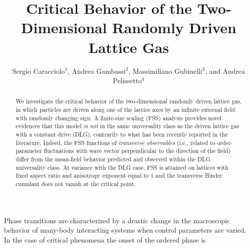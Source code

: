 \documentclass[aps,prl,twocolumn,floatfix,amssymb,showpacs]{revtex4}
\begin{document}
\title{Critical Behavior of the Two-Dimensional Randomly Driven Lattice Gas}
\author{Sergio Caracciolo$^{1}$, Andrea Gambassi$^{2}$, Massimiliano
Gubinelli$^{3}$, and Andrea Pelissetto$^{4}$}
\begin{abstract}
We investigate the critical behavior of the two-dimensional 
randomly driven lattice gas, in which particles 
are driven along one of the lattice axes by an infinite external field with
randomly changing sign. 
A finite-size scaling (FSS) analysis 
provides novel evidences that this model 
{\it is not} in the same universality class as the driven lattice gas with a
constant drive (DLG), contrarily to what has been recently reported in
the literature.
Indeed, the FSS functions of {\it transverse observables}
(i.e., related to order-parameter fluctuations with wave
vector perpendicular to the direction of the field) 
differ from the mean-field behavior predicted and 
observed within the DLG universality class.
At variance with the DLG case, FSS is attained on 
lattices with fixed aspect ratio and anisotropy exponent equal to $1$ 
and the transverse Binder cumulant does not vanish at the critical
point.
\end{abstract}
%
%
\maketitle
  Phase transitions are characterized by a drastic change in the
  macroscopic behavior of many-body interacting systems when control
  parameters are varied. 
  In the case of critical phenomena the onset of the ordered phase is
\end{document}
